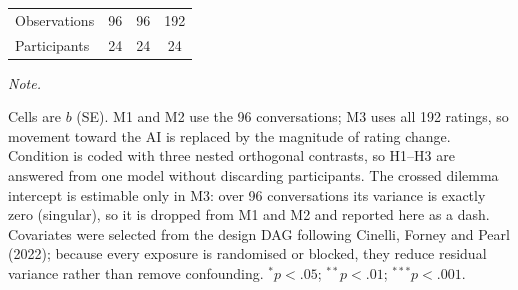 \begin{table}[!h]
\begin{threeparttable}
\begin{tabular}[t]{lccc}
\hspace{1em}Observations & 96 & 96 & 192\\
\hspace{1em}Participants & 24 & 24 & 24\\
\bottomrule
\end{tabular}
\begin{tablenotes}
\item \textit{Note.} 
\item Cells are $b$ (SE). M1 and M2 use the 96 conversations; M3 uses all 192 ratings, so movement toward the AI is replaced by the magnitude of rating change. Condition is coded with three nested orthogonal contrasts, so H1--H3 are answered from one model without discarding participants. The crossed dilemma intercept is estimable only in M3: over 96 conversations its variance is exactly zero (singular), so it is dropped from M1 and M2 and reported here as a dash. Covariates were selected from the design DAG following Cinelli, Forney and Pearl (2022); because every exposure is randomised or blocked, they reduce residual variance rather than remove confounding. $^{*}p<.05$; $^{**}p<.01$; $^{***}p<.001$.
\end{tablenotes}
\end{threeparttable}
\end{table}
